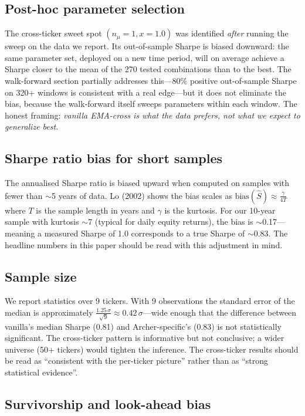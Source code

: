 \documentclass[11pt,a4paper]{article}
\begin{document}
\subsection{Post-hoc parameter selection}

The cross-ticker sweet spot $(n_\mu=1, x=1.0)$ was identified \emph{after} running the sweep on the data we report. Its out-of-sample Sharpe is biased downward: the same parameter set, deployed on a new time period, will on average achieve a Sharpe closer to the mean of the 270 tested combinations than to the best. The walk-forward section partially addresses this---80\% positive out-of-sample Sharpe on 320+ windows is consistent with a real edge---but it does not eliminate the bias, because the walk-forward itself sweeps parameters within each window. The honest framing: \emph{vanilla EMA-cross is what the data prefers, not what we expect to generalize best}.

\subsection{Sharpe ratio bias for short samples}

The annualised Sharpe ratio is biased upward when computed on samples with fewer than $\sim$5 years of data. Lo (2002) shows the bias scales as $\text{bias}(\hat{S}) \approx \frac{\gamma}{4T}$ where $T$ is the sample length in years and $\gamma$ is the kurtosis. For our 10-year sample with kurtosis $\sim$7 (typical for daily equity returns), the bias is $\sim$0.17---meaning a measured Sharpe of 1.0 corresponds to a true Sharpe of $\sim$0.83. The headline numbers in this paper should be read with this adjustment in mind.

\subsection{Sample size}

We report statistics over 9 tickers. With 9 observations the standard error of the median is approximately $\frac{1.25\,\sigma}{\sqrt{9}} \approx 0.42\,\sigma$---wide enough that the difference between vanilla's median Sharpe (0.81) and Archer-specific's (0.83) is not statistically significant. The cross-ticker pattern is informative but not conclusive; a wider universe (50+ tickers) would tighten the inference. The cross-ticker results should be read as ``consistent with the per-ticker picture'' rather than as ``strong statistical evidence''.

\subsection{Survivorship and look-ahead bias}
\end{document}
